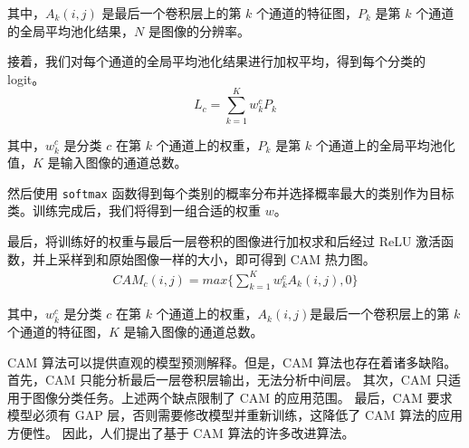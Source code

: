 \documentclass[supercite]{Experimental_Report}
\theoremstyle{definition}
\begin{document}
其中，$A_k(i, j)$ 是最后一个卷积层上的第 $k$ 个通道的特征图，$P_k$ 是第 $k$ 个通道的全局平均池化结果，$N$ 是图像的分辨率。

接着，我们对每个通道的全局平均池化结果进行加权平均，得到每个分类的 logit。
\begin{equation}
  L_c=\sum_{k=1}^{K}w_k^cP_k
\end{equation}

其中，$w_k^c$ 是分类 $c$ 在第 $k$ 个通道上的权重，$P_k$ 是第 $k$ 个通道上的全局平均池化值，$K$ 是输入图像的通道总数。

然后使用 \texttt{softmax} 函数得到每个类别的概率分布并选择概率最大的类别作为目标类。训练完成后，我们将得到一组合适的权重 $w$。

最后，将训练好的权重与最后一层卷积的图像进行加权求和后经过 ReLU 激活函数，并上采样到和原始图像一样的大小，即可得到 CAM 热力图。
\begin{eqnarray}
  CAM_c(i, j)=max\{\sum_{k=1}^{K}w_k^cA_k(i, j), 0\}
\end{eqnarray}

其中，$w_k^c$ 是分类 $c$ 在第 $k$ 个通道上的权重，$A_k(i, j)$是最后一个卷积层上的第 $k$ 个通道的特征图，$K$ 是输入图像的通道总数。

CAM 算法可以提供直观的模型预测解释。但是，CAM 算法也存在着诸多缺陷。
首先，CAM 只能分析最后一层卷积层输出，无法分析中间层。
其次，CAM 只适用于图像分类任务。上述两个缺点限制了 CAM 的应用范围。
最后，CAM 要求模型必须有 GAP 层，否则需要修改模型并重新训练，这降低了 CAM 算法的应用方便性。
因此，人们提出了基于 CAM 算法的许多改进算法。
\end{document}
